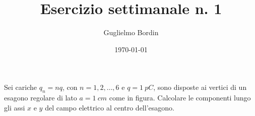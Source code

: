 \documentclass[10pt]{gulartcl}
\title{Esercizio settimanale n. 1}
\author{Guglielmo Bordin}
\date{\today}
\newcommand{\hexagon}{%
    \newdimen\side
    \side = 2cm
    \draw[densely dashed] (0:\side) \foreach \angle in {60, 120, ..., 360}{
        -- (\angle:\side)
    };
    \foreach \i/\pos in
        {1/right, 2/above, 3/above, 4/left, 5/below, 6/below}{
        \node[inner sep=1pt, circle, draw, fill, label={\pos:{$q_{\i}$}}]
            at ({60 * (\i - 1)}:\side) {};
    };}
\begin{document}
\maketitle

\noindent
Sei cariche $q_{n} = n q$, con $n = 1, 2, \dots, 6$ e $q = \qty{1}{pC}$,
sono disposte ai vertici di un esagono regolare di lato $a = \qty{1}{cm}$
come in figura. Calcolare le componenti lungo gli assi $x$ e $y$ del campo
elettrico al centro dell’esagono.

\bigbreak
\begin{center}
\end{center}
\end{document}
